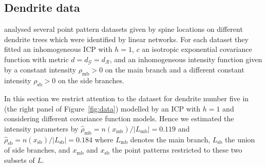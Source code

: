 \documentclass[alpha-refs]{wiley-article}
\begin{document}

\subsection{Dendrite data}\label{s:den-an}

\citet{HeidiMe} analysed several point pattern datasets given by spine locations on different dendrite trees which were identified by linear networks. For each dataset they fitted an inhomogeneous ICP with $h=1$, $c$ an isotropic exponential covariance function with metric $d=d_{\mathcal G}=d_{\mathcal R}$, and an inhomogeneous intensity function given by a constant intensity $\rho_{\mathrm{mb}}>0$ on the main branch and a different constant intensity $\rho_{\mathrm{sb}}>0$ on the side branches. 

In this section we restrict attention to the dataset for dendrite number five in \citet{HeidiMe} (the right panel of Figure~\ref{fig:data}) modelled by 
an ICP with $h=1$ and considering different covariance function models. Hence we
estimated the intensity parameters by $\hat\rho_{\mathrm{mb}}= {n(x_{\mathrm{mb}})}/{|L_{\mathrm{mb}}|}=0.119$ and $\hat\rho_{\mathrm{sb}} = {n(x_{\mathrm{sb}})}/{|L_{\mathrm{sb}}|}=0.184$ where $L_{\mathrm{mb}}$ denotes the main branch, $L_{\mathrm{sb}}$ the union of side branches, and $x_{\mathrm{mb}}$ and $x_{\mathrm{sb}}$ the point patterns restricted to these two subsets of $L$. 

\end{document}
